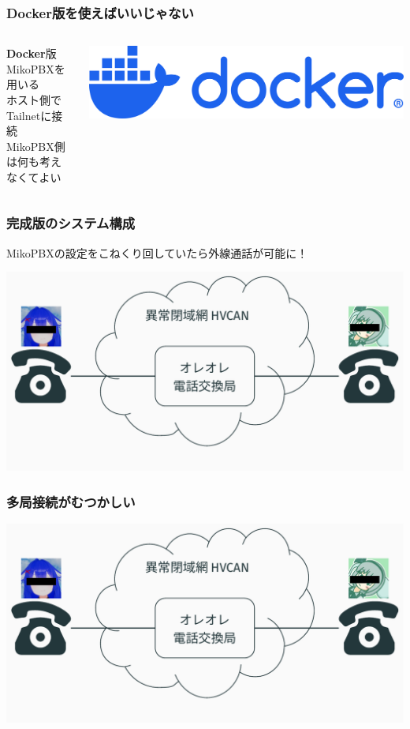 \documentclass[
  lualatex,
  aspectratio=169,
  14pt
]{beamer}
\begin{document}
\begin{frame}
  \frametitle{Docker版を使えばいいじゃない}

  \begin{columns}
    \begin{column}{.6\textwidth}
      \textbf{Docker}版MikoPBXを用いる\\
      \hspace{1.5\zw}ホスト側でTailnetに接続\\
      \hspace{1.5\zw}MikoPBX側は何も考えなくてよい
    \end{column}
    \begin{column}{.39\textwidth}
      \includegraphics[width=\linewidth]{./images/docker.png}
    \end{column}
  \end{columns}
\end{frame}

\begin{frame}
  \frametitle{完成版のシステム構成}

  MikoPBXの設定をこねくり回していたら外線通話が可能に！

  \includegraphics[page=4,width=\linewidth]{./images/pictures.pdf}

\end{frame}

\begin{frame}
  \frametitle{多局接続がむつかしい}

  \includegraphics[page=5,width=\linewidth]{./images/pictures.pdf}
\end{frame}
\end{document}
